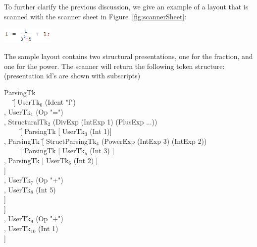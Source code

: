 \documentclass[12pt]{article}
\begin{document}
To further clarify the previous discussion, we give an example of a layout that is scanned with the scanner sheet in Figure~\ref{fig:scannerSheet}:

\begin{center}
\includegraphics[width=1in]{images/scanFrac}\
\end{center}

The sample layout contains two structural presentations, one for the fraction, and one for the power. The scanner will return the following token structure: (presentation id's are shown with subscripts)
\begin{tabbedCode}
ParsingTk \= \\
~~ \= [ UserTk$_0$ (Ident "f") \\
   \> , UserTk$_1$ (Op "=") \\
   \> , StructuralTk$_2$ (DivExp (IntExp 1) (PlusExp ...))\\
   \> ~~~~ \= [ ParsingTk [ UserTk$_3$ (Int 1)] \\
   \>      \> , ParsingTk  \= [ StructParsingTk$_4$ (PowerExp (IntExp 3) (IntExp 2))\\
   \>      \>              \> ~~~~ \= [ ParsingTk [ UserTk$_5$ (Int 3) ] \\
   \>      \>              \>      \> , ParsingTk [ UserTk$_6$ (Int 2) ] \\
   \>      \>              \>      \> ] \\
   \>      \>              \> , UserTk$_7$ (Op "+") \\
   \>      \>              \> , UserTk$_8$ (Int 5) \\
   \>      \>              \> ] \\
   \>      \> ] \\
   \> , UserTk$_9$ (Op "+") \\
   \> , UserTk$_{10}$ (Int 1) \\
   \> ] \\
\end{tabbedCode}

\end{document}
